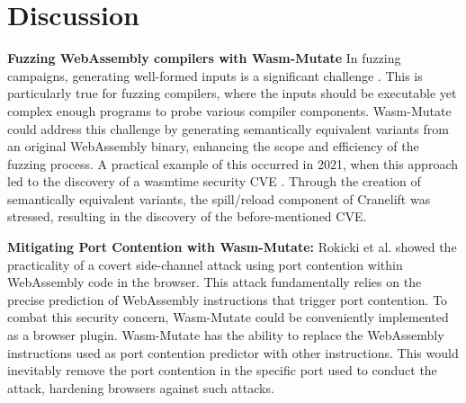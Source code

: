 \documentclass[a4paper,fleqn]{cas-dc}
\newcommand{\tool}{{\sc Wasm-Mutate}\xspace}
\newcommand{\Wasm}{WebAssembly\xspace}
\newcommand{\wasm}{\Wasm}
\begin{document}
\section{Discussion}
\label{discussion}


\textbf{Fuzzing \Wasm compilers with \tool}
In fuzzing campaigns, generating well-formed inputs is a significant challenge \cite{7958599}. 
This is particularly true for fuzzing compilers, where the inputs should be executable yet complex enough programs to probe various compiler components. 
\tool could address this challenge by generating semantically equivalent variants from an original \wasm binary, enhancing the scope and efficiency of the fuzzing process. 
A practical example of this occurred in 2021, when this approach led to the discovery of a wasmtime security CVE \cite{CVE}. 
Through the creation of semantically equivalent variants, the spill/reload component of Cranelift was stressed, resulting in the discovery of the before-mentioned CVE.



\textbf{Mitigating Port Contention with \tool:} 
Rokicki et al. \cite{10.1145/3488932.3517411} showed the practicality of a covert side-channel attack using port contention within \Wasm code in the browser. This attack fundamentally relies on the precise prediction of WebAssembly instructions that trigger port contention.
To combat this security concern, \tool could be conveniently implemented as a browser plugin. 
\tool has the ability to replace the \wasm instructions used as port contention predictor with other instructions.
This would inevitably remove the port contention in the specific port used to conduct the attack, hardening browsers against such attacks.
\end{document}
